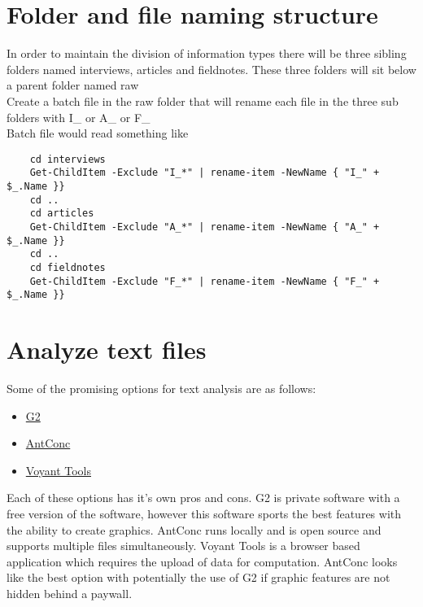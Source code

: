 \documentclass{article}
\begin{document}
\section{Folder and file naming structure}
In order to maintain the division of information types there will be three sibling folders named interviews, articles and fieldnotes. These three folders will sit below a parent folder named raw\\
\linebreak
Create a batch file in the raw folder that will rename each file in the three sub folders with I\_ or A\_ or F\_\\
Batch file would read something like\\

\small{
\begin{verbatim}
    cd interviews
    Get-ChildItem -Exclude "I_*" | rename-item -NewName { "I_" + $_.Name }}
    cd ..
    cd articles
    Get-ChildItem -Exclude "A_*" | rename-item -NewName { "A_" + $_.Name }}
    cd ..
    cd fieldnotes
    Get-ChildItem -Exclude "F_*" | rename-item -NewName { "F_" + $_.Name }}
\end{verbatim}
}
\section{Analyze text files}
Some of the promising options for text analysis are as follows:
\begin{itemize}
    \item \href{https://www.g2.com/categories/text-analysis}{G2}
    \item \href{https://www.laurenceanthony.net/software/antconc/}{AntConc}
    \item \href{Voyant-tools.org}{Voyant Tools}
\end{itemize}

\noindent 
Each of these options has it's own pros and cons. G2 is private software with a free version of the software, however this software sports the best features with the ability to create graphics. AntConc runs locally and is open source and supports multiple files simultaneously. Voyant Tools is a browser based application which requires the upload of data for computation. AntConc looks like the best option with potentially the use of G2 if graphic features are not hidden behind a paywall.
\
\end{document}
